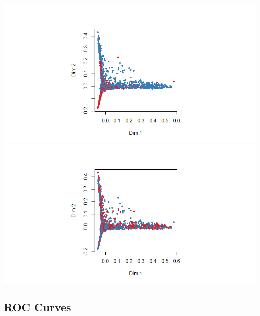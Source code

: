 \documentclass[11pt,preprint, authoryear]{elsarticle}
\let\origfigure\figure
\let\endorigfigure\endfigure
\renewenvironment{figure}[1][2] {
    \expandafter\origfigure\expandafter[H]
} {
    \endorigfigure
}
\numberwithin{equation}{section}
\numberwithin{figure}{section}
\numberwithin{table}{section}
\begin{document}
\begin{figure}[H]

{\centering \includegraphics[width=1\linewidth,height=0.35\textheight]{Figures/MDS_rf3_train} \includegraphics[width=1\linewidth,height=0.35\textheight]{Figures/MDS_rf3_test} 

}

\caption{\label{MDSrf3} Multi-dimensional Scaling plots - Training Data (Top), Test Data (Bottom)}\label{fig:MDSrf3}
\end{figure}

\hypertarget{roc-curves}{%
\subsection*{\texorpdfstring{ROC Curves
\label{roc}}{ROC Curves }}\label{roc-curves}}
\end{document}
